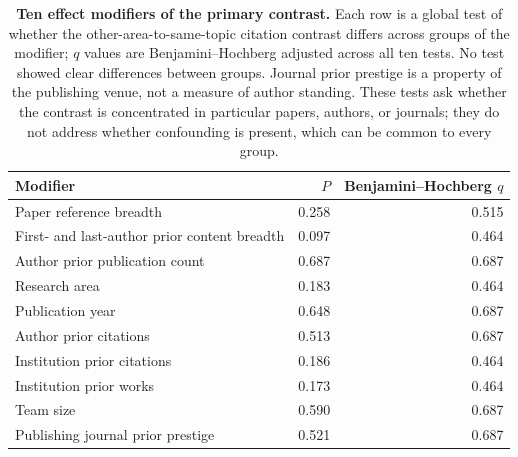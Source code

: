 \begin{table}[H]
\centering
\caption{\textbf{Ten effect modifiers of the primary contrast.}
Each row is a global test of whether the
other-area-to-same-topic citation contrast differs across groups of the modifier; $q$ values are
Benjamini--Hochberg adjusted across all ten tests. No test showed clear differences between
groups. Journal prior prestige is a property of the publishing venue, not a measure of author
standing. These tests ask whether the contrast is concentrated in particular papers, authors, or
journals; they do not address whether confounding is present, which can be common to every
group.}
\label{tab:modifiers}
\footnotesize
\setlength{\tabcolsep}{6pt}
\begin{tabular}{lrr}
\toprule
Modifier & $P$ & Benjamini--Hochberg $q$ \\
\midrule
Paper reference breadth & 0.258 & 0.515 \\
First- and last-author prior content breadth & 0.097 & 0.464 \\
Author prior publication count & 0.687 & 0.687 \\
Research area & 0.183 & 0.464 \\
Publication year & 0.648 & 0.687 \\
Author prior citations & 0.513 & 0.687 \\
Institution prior citations & 0.186 & 0.464 \\
Institution prior works & 0.173 & 0.464 \\
Team size & 0.590 & 0.687 \\
Publishing journal prior prestige & 0.521 & 0.687 \\
\bottomrule
\end{tabular}
\end{table}
